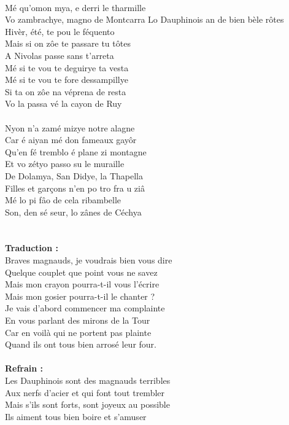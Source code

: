 \\Mé qu'omon mya, e derri le tharmille
\\Vo zambrachye, magno de Montcarra
\breakpage
Lo Dauphinois an de bien bèle rôtes
\\Hivèr, été, te pou le féquento
\\Mais si on zôe te passare tu tôtes
\\A Nivolas passe sans t'arreta
\\Mé si te vou te deguirye ta vesta
\\Mé si te vou te fore dessampillye
\\Si ta on zôe na véprena de resta
\\Vo la passa vé la cayon de Ruy
\\\\Nyon n'a zamé mizye notre alagne
\\Car é aiyan mé don fameaux gayôr
\\Qu'en fé tremblo é plane zi montagne
\\Et vo zétyo passo su le muraille
\\De Dolamya, San Didye, la Thapella
\\Filles et garçons n'en po tro fra u ziâ
\\Mé lo pi fâo de cela ribambelle
\\Son, den sé seur, lo zânes de Céchya
\\\\\\\textbf{Traduction :}
\\Braves magnauds, je voudrais bien vous dire
\\Quelque couplet que point vous ne savez
\\Mais mon crayon pourra-t-il vous l'écrire
\\Mais mon gosier pourra-t-il le chanter ?
\\Je vais d'abord commencer ma complainte
\\En vous parlant des mirons de la Tour
\\Car en voilà qui ne portent pas plainte
\\Quand ils ont tous bien arrosé leur four.
\\\\\textbf{Refrain :}
\\Les Dauphinois sont des magnauds terribles
\\Aux nerfs d'acier et qui font tout trembler
\\Mais s'ils sont forts, sont joyeux au possible
\\Ils aiment tous bien boire et s'amuser
